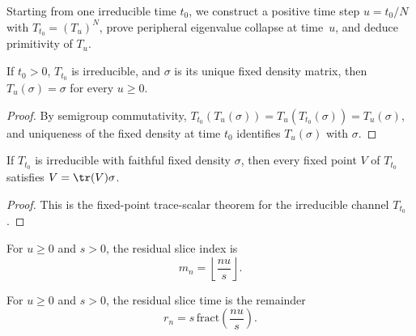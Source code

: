 \begin{remark}\leanok
    Starting from one irreducible time $t_0$, we construct a
    positive time step $u=t_0/N$ with
    $T_{t_0}=(T_u)^N$, prove peripheral eigenvalue collapse at time~$u$,
    and deduce primitivity of $T_u$.
\end{remark}

\begin{theorem}
    \label{thm:fixed_density_fixed_for_all_times_ch12}
    \leanok
    If $t_0 > 0$, $T_{t_0}$ is irreducible, and $\sigma$ is its unique fixed density
    matrix, then $T_u(\sigma)=\sigma$ for every $u \ge 0$.
\end{theorem}

\begin{proof}
    \leanok
    By semigroup commutativity, $T_{t_0}(T_u(\sigma)) = T_u(T_{t_0}(\sigma)) = T_u(\sigma)$,
    and uniqueness of the fixed density at time $t_0$ identifies $T_u(\sigma)$ with $\sigma$.
\end{proof}

\begin{theorem}
    \label{thm:fixedPoint_eq_trace_smul_at_irreducible_time_ch12}
    \leanok
    If $T_{t_0}$ is irreducible with faithful fixed density $\sigma$, then every fixed point
    $V$ of $T_{t_0}$ satisfies $V = \tr(V) \sigma$.
\end{theorem}

\begin{proof}
    \leanok
    This is the fixed-point trace-scalar theorem for the irreducible channel $T_{t_0}$.
\end{proof}

\begin{definition}
    \label{def:residual_slice_index_ch12}
    \leanok
    For $u \ge 0$ and $s > 0$, the residual slice index is
    \[
        m_n = \left\lfloor \frac{nu}{s} \right\rfloor.
    \]
\end{definition}

\begin{definition}
    \label{def:residual_slice_time_ch12}
    \leanok
    For $u \ge 0$ and $s > 0$, the residual slice time is the remainder
    \[
        r_n = s\,\mathrm{fract}\!\left(\frac{nu}{s}\right).
    \]
\end{definition}

